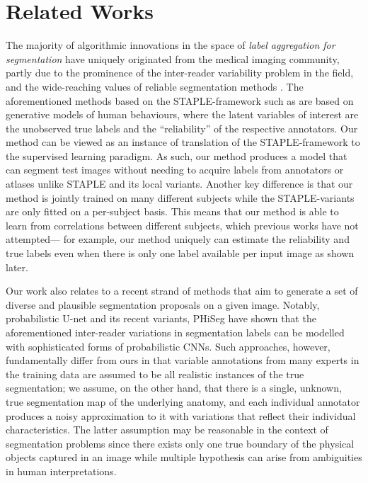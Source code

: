 \section{Related Works}
\vspace{-2mm}

The majority of algorithmic innovations in the space of \textit{label aggregation for segmentation} have uniquely originated from the medical imaging community, partly due to the prominence of the inter-reader variability problem in the field, and the wide-reaching values of reliable segmentation methods \cite{asman2012formulating}. The aforementioned methods based on the STAPLE-framework such as \cite{warfield2004simultaneous,asman2011robust,asman2012formulating,cardoso2013steps,weisenfeld2011learning,asman2013non,asman2013non,akhondi2014logarithmic,joskowicz2018automatic} are based on generative models of human behaviours, where the latent variables of interest are the unobserved true labels and the ``reliability'' of the respective annotators. Our method can be viewed as an instance of translation of the STAPLE-framework to the supervised learning paradigm. As such, our method produces a model that can segment test images without needing to acquire labels from annotators or atlases unlike STAPLE and its local variants. Another key difference is that our method is jointly trained on many different subjects while the STAPLE-variants are only fitted on a per-subject basis. This means that our method is able to learn from correlations between different subjects, which previous works have not attempted--- for example, our method uniquely can estimate the reliability and true labels even when there is only one label available per input image as shown later. 

Our work also relates to a recent strand of methods that aim to generate a set of diverse and plausible segmentation proposals on a given image. Notably, probabilistic U-net \cite{kohl2018probabilistic} and its recent variants, PHiSeg \cite{baumgartner2019phiseg} have shown that the aforementioned inter-reader variations in segmentation labels can be modelled with sophisticated forms of probabilistic CNNs. Such approaches, however, fundamentally differ from ours in that variable annotations from many experts in the training data are assumed to be all realistic instances of the true segmentation; we assume, on the other hand, that there is a single, unknown, true segmentation map of the underlying anatomy, and each individual annotator produces a noisy approximation to it with variations that reflect their individual characteristics. The latter assumption may be reasonable in the context of segmentation problems since there exists only one true boundary of the physical objects captured in an image while multiple hypothesis can arise from ambiguities in human interpretations.


